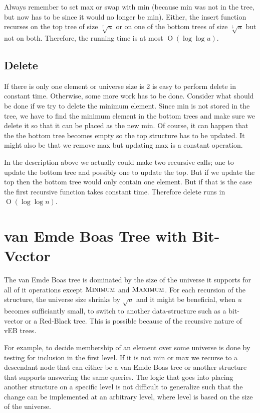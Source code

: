 \documentclass[oneside,11pt,openright]{report}
\newcommand{\BigO}[1]{\ensuremath{\operatorname{O}\left(#1\right)}}
\newcommand{\Minimum}{\textsc{Minimum}}
\newcommand{\Maximum}{\textsc{Maximum}}
\newcommand{\HIGHER}{\sqrt[\uparrow]{u}}
\newcommand{\LOWER}{\sqrt[\downarrow]{u}}
\begin{document}
Always remember to set max or swap with min (because min was not in the tree, but now has to be since it would no longer be min). Either, the insert function recurses on the top tree of size $\HIGHER$ or on one of the bottom trees of size $\LOWER$ but not on both. Therefore, the running time is at most $\BigO{\log \log u}$.

\section{Delete}

If there is only one element or universe size is 2 is easy to perform delete in constant time. Otherwise, some more work has to be done. Consider what should be done if we try to delete the minimum element. Since min is not stored in the tree, we have to find the minimum element in the bottom trees and make sure we delete it so that it can be placed as the new min. Of course, it can happen that the the bottom tree becomes empty so the top structure has to be updated. It might also be that we remove max but updating max is a constant operation.

In the description above we actually could make two recursive calls; one to update the bottom tree and possibly one to update the top. But if we update the top then the bottom tree would only contain one element. But if that is the case the first recursive function takes constant time. Therefore delete runs in $\BigO{\log \log n}$.

\chapter{van Emde Boas Tree with Bit-Vector}

The van Emde Boas tree is dominated by the size of the universe it supports for all of it operations except $\Minimum$ and $\Maximum$. For each recursion of the structure, the universe size shrinks by $\sqrt{u}$ and it might be beneficial, when $u$ becomes sufficiantly small, to switch to another data-structure such as a bit-vector or a Red-Black tree. This is possible because of the recursive nature of vEB trees. 

For example, to decide membership of an element over some universe is done by testing for inclusion in the first level. If it is not min or max we recurse to a descendant node that can either be a van Emde Boas tree or another structure that supports answering the same queries. The logic that goes into placing another structure on a specific level is not difficult to generalize such that the change can be implemented at an arbitrary level, where level is based on the size of the universe.
\end{document}
